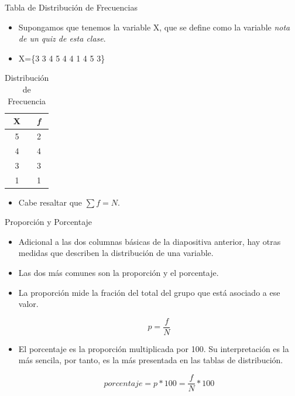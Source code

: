 \documentclass[xcolor=dvipsnames]{beamer}
\begin{document}
\begin{frame}{Tabla de Distribución de Frecuencias}
\begin{itemize}
\justifying
\item Supongamos que tenemos la variable X, que se define como la variable \emph{nota de un quiz de esta clase}.
\item X=\{3 3 4 5 4 4 1 4 5 3\}
\end{itemize}

\begin{center}
	\begin{table}[H]
		\caption{Distribución de Frecuencia}
		\begin{tabular}{cc} \hline
			X & \emph{f} \\ \hline
			5 & 2 \\
			4 & 4 \\
			3 & 3 \\
			1 & 1 \\ \hline
		\end{tabular}
	\end{table}
\end{center}
\begin{itemize}
	\justifying
	\item Cabe resaltar que $ \sum f = N $.
\end{itemize}
\end{frame}

\begin{frame}{Proporción y Porcentaje }
\begin{itemize}
\justifying
\item Adicional a las dos columnas básicas de la diapositiva anterior, hay otras medidas que describen la distribución de una variable.
\item Las dos más comunes son la proporción y el porcentaje. 
\item La proporción mide la fración del total del grupo que está asociado a ese valor. 

$$ p=\dfrac{f}{N}$$
\item El porcentaje es la proporción multiplicada por 100. Su interpretación es la más sencila, por tanto, es la más presentada en las tablas de distribución.

$$porcentaje=p*100=\dfrac{f}{N}*100$$
\end{itemize}
\end{frame}
\end{document}
